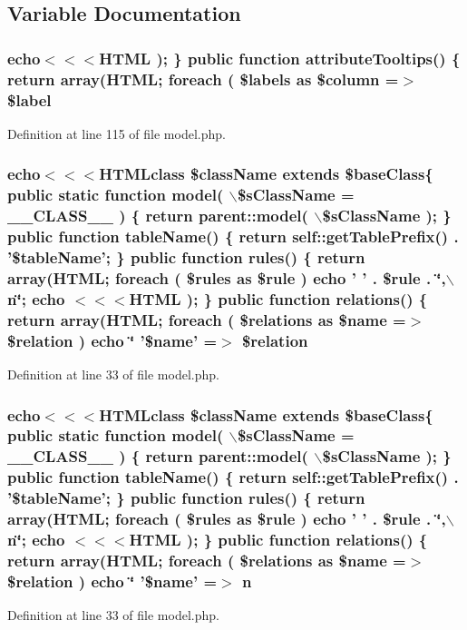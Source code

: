 \subsection{Variable Documentation}
\hypertarget{templates_2model_8php_a0bf7b9a135bed8ed3dcd4c376c25b88b}{
\subsubsection[{\$label}]{\setlength{\rightskip}{0pt plus 5cm}echo$<$$<$$<${\bf HTML} ); \} public function attributeTooltips() \{ return {\bf array}({\bf HTML}; {\bf foreach} ( \$labels as \$column =$>$ \$label}}
\label{templates_2model_8php_a0bf7b9a135bed8ed3dcd4c376c25b88b}


Definition at line 115 of file model.php.

\hypertarget{templates_2model_8php_a071d5a15ecc5f0db7b14df0dca0c6e47}{
\subsubsection[{\$relation}]{\setlength{\rightskip}{0pt plus 5cm}echo$<$$<$$<$HTMLclass \$className extends \$baseClass\{ public static function model( $\backslash$\$sClassName = \_\-\_\-CLASS\_\-\_\- ) \{ return parent::model( $\backslash$\$sClassName ); \} public function tableName() \{ return self::getTablePrefix() . '\$tableName'; \} public function rules() \{ return {\bf array}({\bf HTML}; {\bf foreach} ( \$rules as \$rule ) echo ' ' . \$rule . \char`\"{},$\backslash$n\char`\"{}; echo $<$$<$$<${\bf HTML} ); \} public function relations() \{ return {\bf array}({\bf HTML}; {\bf foreach} ( \$relations as \$name =$>$ \$relation ) echo \char`\"{} '\$name' =$>$ \$relation}}
\label{templates_2model_8php_a071d5a15ecc5f0db7b14df0dca0c6e47}


Definition at line 33 of file model.php.

\hypertarget{templates_2model_8php_a379b45186169096aa004a82fc6fee26d}{
\subsubsection[{n}]{\setlength{\rightskip}{0pt plus 5cm}echo$<$$<$$<$HTMLclass \$className extends \$baseClass\{ public static function model( $\backslash$\$sClassName = \_\-\_\-CLASS\_\-\_\- ) \{ return parent::model( $\backslash$\$sClassName ); \} public function tableName() \{ return self::getTablePrefix() . '\$tableName'; \} public function rules() \{ return {\bf array}({\bf HTML}; {\bf foreach} ( \$rules as \$rule ) echo ' ' . \$rule . \char`\"{},$\backslash$n\char`\"{}; echo $<$$<$$<${\bf HTML} ); \} public function relations() \{ return {\bf array}({\bf HTML}; {\bf foreach} ( \$relations as \$name =$>$ \$relation ) echo \char`\"{} '\$name' =$>$ {\bf n}}}
\label{templates_2model_8php_a379b45186169096aa004a82fc6fee26d}


Definition at line 33 of file model.php.

